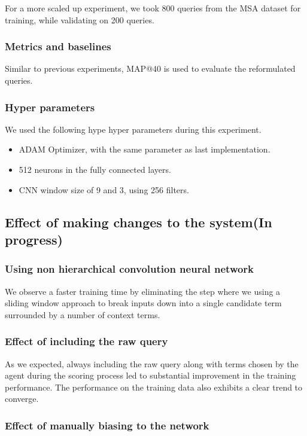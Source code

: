 For a more scaled up experiment, we took 800 queries from the MSA dataset for training, while validating on 200 queries. 


\subsubsection{Metrics and baselines}
Similar to previous experiments, MAP@40 is used to evaluate the reformulated queries.

\subsubsection{Hyper parameters}
We used the following hype hyper parameters during this experiment.

\begin{itemize}
	\item ADAM Optimizer, with the same parameter as last implementation.
	\item 512 neurons in the fully connected layers.
	\item CNN window size of 9 and 3, using 256 filters.
\end{itemize}





\subsection{Effect of making changes to the system(In progress)}


\subsubsection{Using non hierarchical convolution neural network}

We observe a faster training time by eliminating the step where we using a sliding window approach to break inputs down into a single candidate term surrounded by a number of context terms. 

\subsubsection{Effect of including the raw query}
As we expected, always including the raw query along with terms chosen by the agent during the scoring process led to substantial improvement in the training performance. The performance on the training data also exhibits a clear trend to converge. 

\subsubsection{Effect of manually biasing to the network}

